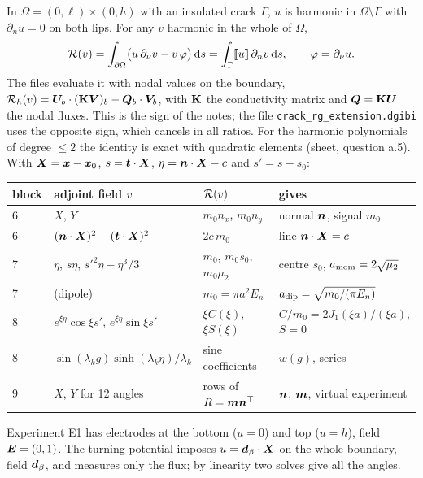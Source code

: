 In $\Omega=(0,\ell)\times(0,h)$ with an insulated crack $\Gamma$, $u$ is
harmonic in $\Omega\setminus\Gamma$ with $\partial_nu=0$ on both lips. For any
$v$ harmonic in the whole of $\Omega$,
\[
\mathcal{R}(v)=\int_{\partial\Omega}\bigl(u\,\partial_\nu v-v\,\varphi\bigr)\,\mathrm{d} s
=\int_\Gamma[\![u]\!]\,\partial_nv\,\mathrm{d} s,\qquad\varphi=\partial_\nu u .
\]
The files evaluate it with nodal values on the boundary,
$\mathcal{R}_h(v)=\bm{U}_b\cdot(\mathbf{K}\bm{V})_b-\bm{Q}_b\cdot\bm{V}_b$, with $\mathbf{K}$
the conductivity matrix and $\bm{Q}=\mathbf{K}\bm{U}$ the nodal fluxes. This is
the sign of the notes; the file \texttt{crack\_rg\_extension.dgibi} uses the
opposite sign, which cancels in all ratios. For the harmonic polynomials of
degree $\le2$ the identity is exact with quadratic elements (sheet,
question a.5). With $\bm{X}=\bm{x}-\bm{x}_0$, $s=\bm{t}\cdot\bm{X}$,
$\eta=\bm{n}\cdot\bm{X}-c$ and $s'=s-s_0$:
\begin{center}\small
\renewcommand{\arraystretch}{1.15}
\begin{tabular}{llll}
\toprule
\sffamily block & \sffamily adjoint field $v$ & \sffamily $\mathcal{R}(v)$ & \sffamily gives\\
\midrule
6 & $X$, $Y$ & $m_0n_x$, $m_0n_y$ & normal $\bm{n}$, signal $m_0$\\
6 & $(\bm{n}\cdot\bm{X})^2-(\bm{t}\cdot\bm{X})^2$ & $2c\,m_0$ & line $\bm{n}\cdot\bm{X}=c$\\
7 & $\eta$, $s\eta$, $s'^2\eta-\eta^3/3$ & $m_0$, $m_0s_0$, $m_0\mu_2$ & centre $s_0$, $a_{\rm mom}=2\sqrt{\mu_2}$\\
7 & (dipole) & $m_0=\pi a^2E_n$ & $a_{\rm dip}=\sqrt{m_0/(\pi E_n)}$\\
8 & $e^{\xi\eta}\cos\xi s'$, $e^{\xi\eta}\sin\xi s'$ & $\xi C(\xi)$, $\xi S(\xi)$ & $C/m_0=2J_1(\xi a)/(\xi a)$, $S=0$\\
8 & $\sin(\lambda_kg)\sinh(\lambda_k\eta)/\lambda_k$ & sine coefficients & $w(g)$, series\\
9 & $X$, $Y$ for 12 angles & rows of $R=\bm{m}\bm{n}^\top$ & $\bm{n}$, $\bm{m}$, virtual experiment\\
\bottomrule
\end{tabular}
\end{center}
Experiment E1 has electrodes at the bottom ($u=0$) and top ($u=h$), field
$\bm{E}=(0,1)$. The turning potential imposes $u=\bm{d}_\beta\cdot\bm{X}$ on the
whole boundary, field $\bm{d}_\beta$, and measures only the flux; by linearity
two solves give all the angles.

